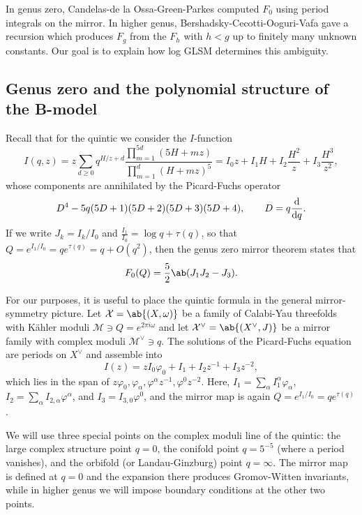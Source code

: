 \documentclass{amsart}
\theoremstyle{definition}
\theoremstyle{remark}
\theoremstyle{plain}
\theoremstyle{definition}
\theoremstyle{remark}
\newcommand{\mc}[1]{\mathcal{#1}}
\newcommand{\1}{\mathbf{1}}
\newcommand{\2}{\mathbf{2}}
\newcommand{\3}{\mathbf{3}}
\begin{document}
In genus zero, Candelas-de la Ossa-Green-Parkes computed \(F_0\) using period integrals on the mirror. In higher genus, Bershadsky-Cecotti-Ooguri-Vafa gave a recursion which produces \(F_g\) from the \(F_h\) with \(h < g\) up to finitely many unknown constants. Our goal is to explain how log GLSM determines this ambiguity.

\subsection{Genus zero and the polynomial structure of the B-model}%
\label{sub:Genus zero and the polynomial structure of the B-model}

Recall that for the quintic we consider the \(I\)-function
\[
    I(q,z) = z\sum_{d \geq 0} q^{H/z+d} \frac{\prod_{m=1}^{5d}(5H+mz)}{\prod_{m=1}^d (H+mz)^5} = I_0 z + I_1 H + I_2 \frac{H^2}{z} + I_3 \frac{H^3}{z^2},
\]
whose components are annihilated by the Picard-Fuchs operator
\[ D^4 - 5q(5D+1)(5D+2)(5D+3)(5D+4), \qquad D = q \odv{}{q}. \]
If we write \(J_k = I_k/I_0\) and \(\frac{I_1}{I_0} = \log q + \tau(q)\), so that \(Q = e^{I_1/I_0} = qe^{\tau(q)} = q + O(q^2)\), then the genus zero mirror theorem states that
\[ F_0(Q) = \frac{5}{2}\ab(J_1 J_2 - J_3). \]

For our purposes, it is useful to place the quintic formula in the general mirror-symmetry picture. Let \(\mc{X} = \ab\{(X,\omega)\}\) be a family of Calabi-Yau threefolds with Kähler moduli \(\mc{M} \ni Q = e^{2\pi i \omega}\) and let \(\mc{X}^{\vee} = \ab\{(X^{\vee},J)\}\) be a mirror family with complex moduli \(\mc{M}^{\vee} \ni q\). The solutions of the Picard-Fuchs equation are periods on \(X^{\vee}\) and assemble into
\[ I(z) = zI_0\varphi_0 + I_1 + I_2 z^{-1} + I_3 z^{-2}, \]
which lies in the span of \(z\varphi_0, \varphi_{\alpha}, \varphi^{\alpha}z^{-1}, \varphi^0 z^{-2}\). Here, \(I_1 = \sum_{\alpha} I_1^{\alpha}\varphi_{\alpha}\), \(I_2 = \sum_{\alpha} I_{2,\alpha}\varphi^{\alpha}\), and \(I_3 = I_{3,0}\varphi^0\), and the mirror map is again \(Q = e^{I_1/I_0} = qe^{\tau(q)}\).

We will use three special points on the complex moduli line of the quintic: the large complex structure point \(q=0\), the conifold point \(q = 5^{-5}\) (where a period vanishes), and the orbifold (or Landau-Ginzburg) point \(q = \infty\). The mirror map is defined at \(q=0\) and the expansion there produces Gromov-Witten invariants, while in higher genus we will impose boundary conditions at the other two points.
\end{document}
